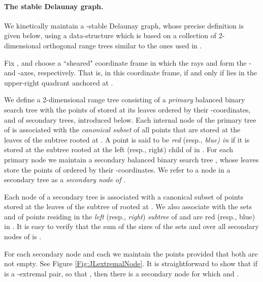 \documentclass[letter,11pt]{article}
\begin{document}
\paragraph{The stable Delaunay graph.}
We kinetically maintain a
-stable Delaunay graph, whose precise definition is given below,
using a data-structure which is based on a collection of 2-dimensional orthogonal range trees similar to the ones used in \cite{KineticNeighbors}.

Fix , and choose a ``sheared" coordinate frame in
 which the rays  and  form the - and -axes,
 respectively. That is, in this coordinate frame,  if and
 only if  lies in the upper-right quadrant anchored at . 
 
We define a 2-dimensional range tree  consisting of a \textit{primary} balanced binary search tree with the
points of  stored at its leaves ordered by their -coordinates, and of secondary trees, introduced below.
Each internal node  of the primary tree of  is associated with the
\emph{canonical subset}  of all points that are stored at the
leaves of the subtree rooted at . A point  is said to be
\emph{red} (resp., {\it blue) in } if it is stored at the subtree rooted at
the left (resp., right) child of  in . For each primary node
 we maintain a secondary balanced binary search tree , whose
leaves store the points of  ordered by their -coordinates.
We refer to a node  in a secondary
tree    as a {\em secondary node  of }.

Each node  of a secondary tree  is associated with a canonical
subset  of points stored at the leaves of the
subtree of   rooted at . We also associate with  the sets
 and  of points  residing in the
\emph{left} (resp., \emph{right}) \emph{subtree} of  and are red
(resp., blue) in .  It is easy to verify that the
 sum of the sizes of the sets  and 
over all secondary nodes of 
 is .


For each secondary
node  and each  we maintain the points 
 provided that both  are not empty. 
See Figure \ref{Fig:JLextremalNode}. It is straightforward to show that if  is a -extremal pair, so that ,
then there
is a secondary node  for which 
 and .
 
\end{document}
